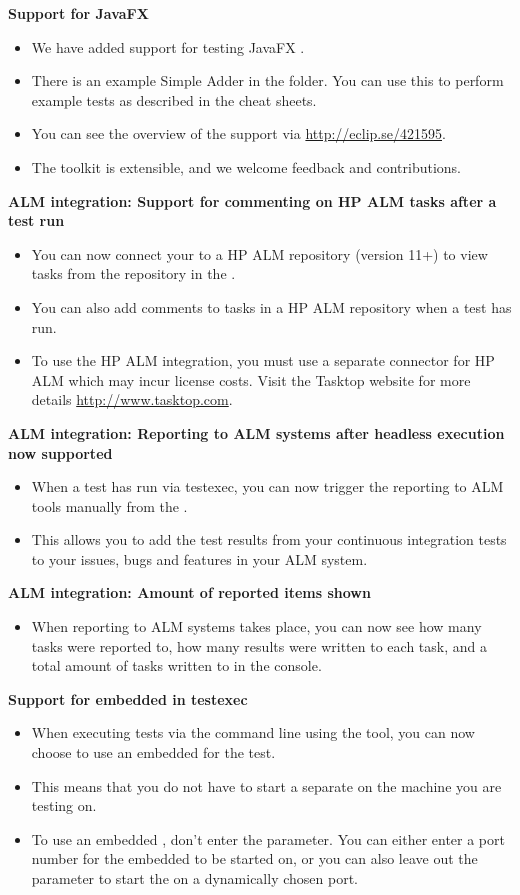 \textbf{Support for JavaFX \gdauts{}}
\begin{itemize}
\item We have added support for testing JavaFX \gdauts{}. 
\item There is an example Simple Adder \gdaut{} in the  folder. You can use this to perform example tests as described in the cheat sheets.
\item You can see the overview of the support via \url{http://eclip.se/421595}.
\item The toolkit is extensible, and we welcome feedback and contributions.
\end{itemize}

\textbf{ALM integration: Support for commenting on HP ALM tasks after a test run}
\begin{itemize}
\item You can now connect your \ite{} to a HP ALM repository (version 11+) to view tasks from the repository in the \ite{}.
\item You can also add comments to tasks in a HP ALM repository when a test has run.
\item To use the HP ALM integration, you must use a separate connector for HP ALM which may incur license costs. Visit the Tasktop website for more details \url{http://www.tasktop.com}.
\end{itemize} 

\textbf{ALM integration: Reporting to ALM systems after headless execution now supported}
\begin{itemize}
\item When a test has run via testexec, you can now trigger the reporting to ALM tools manually from the \gdtestsummaryview{}. 
\item This allows you to add the test results from your continuous integration tests to your issues, bugs and features in your ALM system. 
\end{itemize}

\textbf{ALM integration: Amount of reported items shown}
\begin{itemize}
\item When reporting to ALM systems takes place, you can now see how many tasks were reported to, how many results were written to each task, and a total amount of tasks written to in the console.
\end{itemize}

\textbf{Support for embedded \gdagent{} in testexec}
\begin{itemize}
\item When executing tests via the command line using the  tool, you can now choose to use an embedded \gdagent{} for the test.
\item This means that you do not have to start a separate \gdagent{} on the machine you are testing on.
\item To use an embedded \gdagent{}, don't enter the  parameter. You can either enter a port number for the embedded \gdagent{} to be started on, or you can also leave out the  parameter to start the \gdagent{} on a dynamically chosen port.
\end{itemize}

